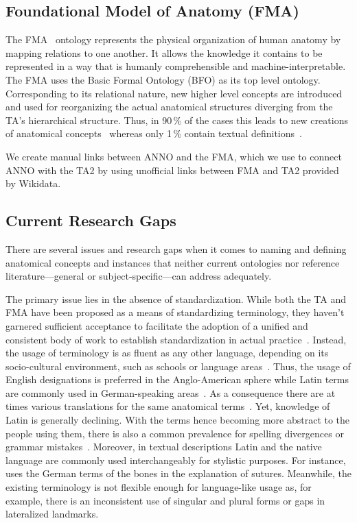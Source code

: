 \documentclass[sw]{iosart2x}
\begin{document}
\subsection{Foundational Model of Anatomy (FMA)}
The FMA~\citep{fma} ontology represents the physical organization of human anatomy by mapping relations to one another.
It allows the knowledge it contains to be represented in a way that is humanly comprehensible and machine-interpretable.
The FMA uses the Basic Formal Ontology (BFO) as its top level ontology.
Corresponding to its relational nature, new higher level concepts are introduced and used for reorganizing the actual anatomical structures diverging from the TA's hierarchical structure.
Thus, in 90\,\% of the cases this leads to new creations of anatomical concepts~\citep{anatomicalterms} whereas only 1\,\% contain textual definitions~\citep{uberon}.

We create manual links between ANNO and the FMA, which we use to connect ANNO with the TA2 by using unofficial links between FMA and TA2 provided by Wikidata.

\subsection{Current Research Gaps}

There are several issues and research gaps when it comes to naming and defining anatomical concepts and instances that neither current ontologies nor reference literature---general or subject-specific---can address adequately.

The primary issue lies in the absence of standardization.
While both the TA and FMA have been proposed as a means of standardizing terminology, they haven't garnered sufficient acceptance to facilitate the adoption of a unified and consistent body of work to establish standardization in actual practice~\citep{frequencyta,doestamatter,athighlights}.
Instead, the usage of terminology is as fluent as any other language, depending on its socio-cultural environment, such as schools or language areas~\citep{doestamatter,atthennow,atinfo,frequencyta,atcompare}.
Thus, the usage of English designations is preferred in the Anglo-American sphere while Latin terms are commonly used in German-speaking areas~\citep{anatomycontribution,anatomylexicon,reforminganatomical}.
As a consequence there are at times various translations for the same anatomical terms~\citep{naminggame}.
Yet, knowledge of Latin is generally declining.
With the terms hence becoming more abstract to the people using them, there is also a common prevalence for spelling divergences or grammar mistakes~\citep{ta17,anatomylexicon,athighlights,diphthongs}.
Moreover, in textual descriptions Latin and the native language are commonly used interchangeably for stylistic purposes.
For instance, \cite{anatomylexicon} uses the German terms of the bones in the explanation of sutures.
Meanwhile, the existing terminology is not flexible enough for language-like usage as, for example, there is an inconsistent use of singular and plural forms or gaps in lateralized landmarks.
\end{document}
